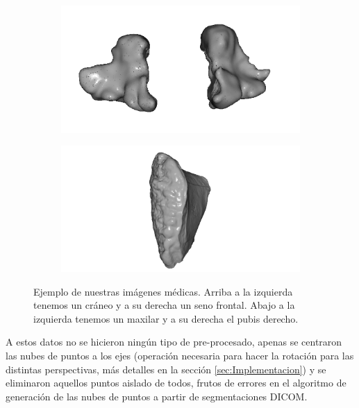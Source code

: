 \begin{figure}[htp]
  \begin{subfigure}[b]{0.49\textwidth}
  \centering 
  \includegraphics[width=\textwidth]{imagenes/chapter4/Maxilar100205.png}
  \end{subfigure}
  \begin{subfigure}[b]{0.49\textwidth}
  \centering 
  \includegraphics[width=\textwidth]{imagenes/chapter4/PubisDch.png}
  \end{subfigure}
  \caption[Ejemplo de nuestras imágenes médicas]{Ejemplo de nuestras imágenes médicas.
  Arriba a la izquierda tenemos un cráneo y a su derecha un seno frontal. 
  Abajo a la izquierda tenemos un maxilar y a su derecha el pubis derecho.}
  \label{fig:OurDataExample}
\end{figure}

A estos datos no se hicieron ningún tipo de pre-procesado, apenas se centraron 
las nubes de puntos a los ejes (operación necesaria para hacer la rotación para 
las distintas perspectivas, más detalles en la sección \ref{sec:Implementacion})
y se eliminaron aquellos puntos aislado de todos, frutos de errores en el 
algoritmo de generación de las nubes de puntos a partir de segmentaciones DICOM.

